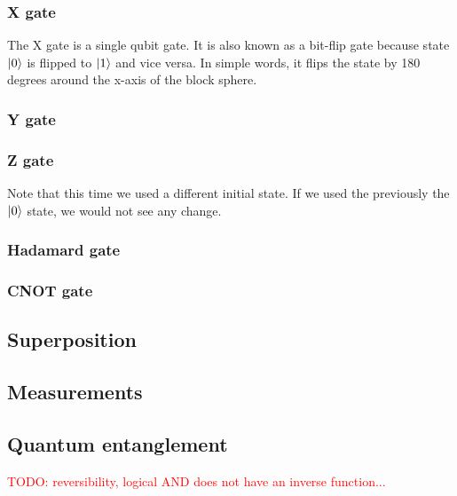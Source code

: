 \subsubsection{X gate}
The X gate is a single qubit gate. It is also known as a bit-flip gate because state $\lvert0\rangle$ is flipped to $\lvert1\rangle$ and vice versa. In simple words, it flips the state by 180 degrees around the x-axis of the block sphere.




\subsubsection{Y gate}

\subsubsection{Z gate}
Note that this time we used a different initial state. If we used the previously the $\lvert0\rangle$ state, we would not see any change.
\subsubsection{Hadamard gate}
\subsubsection{CNOT gate}
\subsection{Superposition}
\subsection{Measurements}
\subsection{Quantum entanglement}
\textcolor{red}{TODO: reversibility, logical AND does not have an inverse function...}